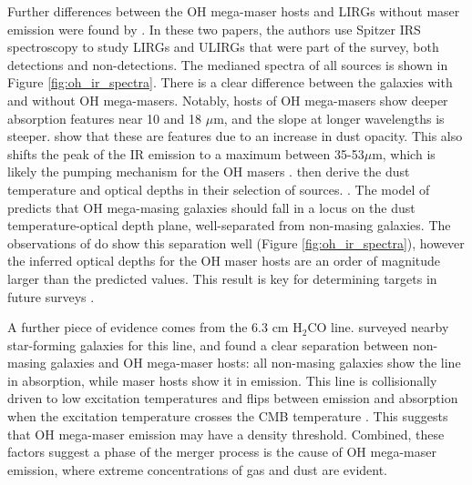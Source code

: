 Further differences between the OH mega-maser hosts and LIRGs without maser emission were found by \citet{willett2011_I,willett2011_II}. In these two papers, the authors use Spitzer IRS spectroscopy to study LIRGs and ULIRGs that were part of the \citet{darling2002_paperIII} survey, both detections and non-detections. The medianed spectra of all sources is shown in Figure \ref{fig:oh_ir_spectra}. There is a clear difference between the galaxies with and without OH mega-masers. Notably, hosts of OH mega-masers show deeper absorption features near 10 and 18 $\mu$m, and the slope at longer wavelengths is steeper. \citet{ivezic1997} show that these are features due to an increase in dust opacity. This also shifts the peak of the IR emission to a maximum between 35-53$\mu$m, which is likely the pumping mechanism for the OH masers \citep{darling2012}. \citet{willett2011_II} then derive the dust temperature and optical depths in their selection of sources. \citep{darling2012}. The model of \citet{lockett2008} predicts that OH mega-masing galaxies should fall in a locus on the dust temperature-optical depth plane, well-separated from non-masing galaxies. The observations of \citet{willett2011_I} do show this separation well (Figure \ref{fig:oh_ir_spectra}), however the inferred optical depths for the OH maser hosts are an order of magnitude larger than the predicted values. This result is key for determining targets in future surveys \citep{darling2012}.

A further piece of evidence comes from the 6.3 cm H$_{2}$CO line. \citet{Mangum_2008} surveyed nearby star-forming galaxies for this line, and found a clear separation between non-masing galaxies and OH mega-maser hosts: all non-masing galaxies show the line in absorption, while maser hosts show it in emission. This line is collisionally driven to low excitation temperatures and flips between emission and absorption when the excitation temperature crosses the CMB temperature \citep{darling2012}. This suggests that OH mega-maser emission may have a density threshold. Combined, these factors suggest a phase of the merger process is the cause of OH mega-maser emission, where extreme concentrations of gas and dust are evident.

